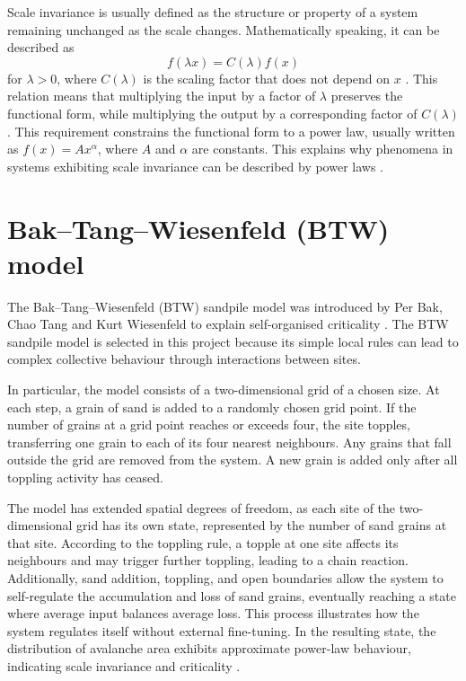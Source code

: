 \begingroup
\renewcommand{\thefootnote}{}
\endgroup

\newpage

Scale invariance is usually defined as the structure or property of a system remaining unchanged as the scale changes. Mathematically speaking, it can be described as $$f(\lambda x) = C(\lambda) f(x)$$
for $\lambda > 0$, where $C(\lambda)$ is the scaling factor that does not depend on $x$ \cite{Khaluf2017}. This relation means that multiplying the input by a factor of \(\lambda\) preserves the functional form, while multiplying the output by a corresponding factor of \(C(\lambda)\). This requirement constrains the functional form to a power law, usually written as $f(x) = Ax^\alpha$, where \(A\) and \(\alpha\) are constants. This explains why phenomena in systems exhibiting scale invariance can be described by power laws  \cite{Newman2005, Sornette1998}.

\section{Bak–Tang–Wiesenfeld (BTW) model}

The Bak–Tang–Wiesenfeld (BTW) sandpile model was introduced by Per Bak, Chao Tang and Kurt Wiesenfeld to explain self-organised criticality \cite{Bak1987}. The BTW sandpile model is selected in this project because its simple local rules can lead to complex collective behaviour through interactions between sites. 

In particular, the model consists of a two-dimensional grid of a chosen size. At each step, a grain of sand is added to a randomly chosen grid point. If the number of grains at a grid point reaches or exceeds four, the site topples, transferring one grain to each of its four nearest neighbours. Any grains that fall outside the grid are removed from the system. A new grain is added only after all toppling activity has ceased. 

The model has extended spatial degrees of freedom, as each site of the two-dimensional grid has its own state, represented by the number of sand grains at that site. According to the toppling rule, a topple at one site affects its neighbours and may trigger further toppling, leading to a chain reaction. Additionally, sand addition, toppling, and open boundaries allow the system to self-regulate the accumulation and loss of sand grains, eventually reaching a state where average input balances average loss. This process illustrates how the system regulates itself without external fine-tuning. In the resulting state, the distribution of avalanche area exhibits approximate power-law behaviour, indicating scale invariance and criticality \cite{Bak1987}.


